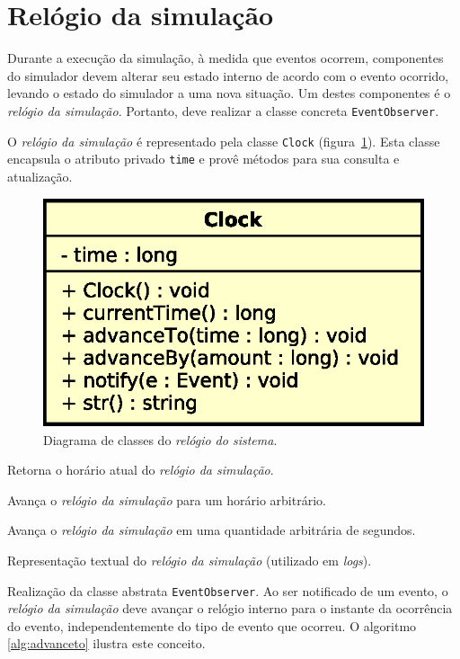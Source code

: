\section{Relógio da simulação} Durante a execução da simulação, à medida que
eventos ocorrem, componentes do simulador devem alterar seu estado interno de
acordo com o evento ocorrido, levando o estado do simulador a uma nova situação.
Um destes componentes é o \textit{relógio da simulação}. Portanto, deve realizar
a classe concreta \texttt{EventObserver}.

O \textit{relógio da simulação} é representado pela classe \texttt{Clock}
(figura~\ref{fig:diagram:clock}). Esta classe encapsula o atributo privado
\texttt{time} e provê métodos para sua consulta e atualização.

\begin{figure}[htb!]
  \centering
  \includegraphics[scale=0.6]{img/Clock}
  \caption{Diagrama de classes do \textit{relógio do sistema}.}
\label{fig:diagram:clock}
\end{figure}

\begin{description}[leftmargin=!,labelwidth=\widthof{\bfseries currentTime}]
  \item[\texttt{currentTime}] Retorna o horário atual do \textit{relógio da simulação}.
  \item[\texttt{advanceTo}] Avança o \textit{relógio da simulação} para um horário arbitrário.
  \item[\texttt{advanceBy}] Avança o \textit{relógio da simulação} em uma quantidade arbitrária de segundos.
  \item[\texttt{str}] Representação textual do \textit{relógio da simulação} (utilizado em \textit{logs}).
  \item[\texttt{notify}]
  Realização da classe abstrata \texttt{EventObserver}. Ao ser notificado de um
  evento, o \textit{relógio da simulação} deve avançar o relógio interno para o
  instante da ocorrência do evento, independentemente do tipo de evento que
  ocorreu. O algoritmo \ref{alg:advanceto} ilustra este conceito.
\end{description}

